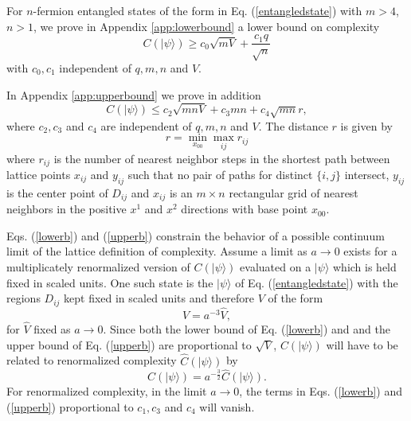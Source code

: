 \documentclass[twocolumn,amsmath,amssymb]{revtex4-1}
\begin{document}
For $n$-fermion entangled states of the form in Eq. (\ref{entangledstate})
with $m > 4$, $n > 1$,
we prove in Appendix \ref{app:lowerbound} a lower bound on complexity
\begin{equation}
\label{lowerb}
C( |\psi \rangle ) \geq c_0 \sqrt{m V} + \frac{ c_1 q}{\sqrt{n}}
\end{equation}
with $c_0, c_1$ independent of $q, m, n$ and $V$.

In Appendix \ref{app:upperbound} we prove in addition
\begin{equation}
\label{upperb}
C( |\psi \rangle ) \leq c_2 \sqrt{m n V} + c_3m n + c_4\sqrt{mn} r,
\end{equation}
where $c_2, c_3$ and $c_4$ are  independent of $q, m, n$ and $V$.
The distance $r$ is given by
\begin{equation}
  \label{defsbar}
  r = \min_{x_{00}} \max_{ij} r_{ij}
\end{equation}
where $r_{ij}$ is the number of nearest
neighbor steps in the
shortest path between
lattice points $x_{ij}$ and $y_{ij}$
such that no pair of paths for distinct
$\{i, j\}$ intersect,
$y_{ij}$ is the center point of $D_{ij}$
and $x_{ij}$ is an $m \times n$ rectangular grid
of nearest neighbors in the positive $x^1$ and $x^2$ directions
with base point $x_{00}$.

Eqs. (\ref{lowerb}) and (\ref{upperb}) constrain
the behavior of a possible
continuum limit of the lattice definition
of complexity.  
Assume a limit as $a \rightarrow 0$  exists for
a multiplicately 
renormalized version of $C( |\psi \rangle )$
evaluated on a $|\psi \rangle$ which is held fixed
in scaled units.
One such state is the $|\psi \rangle$ of Eq. (\ref{entangledstate})
with the regions $D_{ij}$ kept fixed in scaled units
and therefore $V$ of the form
\begin{equation}
  \label{rescaledv}
  V = a^{-3} \hat{V},
\end{equation}
for $\hat{V}$ fixed as $a \rightarrow 0$.
Since both the lower bound of Eq. (\ref{lowerb}) and
and the upper bound of Eq. (\ref{upperb})
are proportional to $\sqrt{V}$,
$C( |\psi \rangle )$ will have to be related to
renormalized complexity
$\hat{C}( |\psi \rangle )$ by
\begin{equation}
  \label{rescaledc}
  C( |\psi \rangle ) = a^{-\frac{3}{2}} \hat{C}( |\psi \rangle ).
\end{equation}
For renormalized complexity,
in the limit $a \rightarrow 0$, the terms in Eqs. (\ref{lowerb})
and (\ref{upperb}) proportional to $c_1, c_3$ and $c_4$
will vanish.
 
\end{document}

